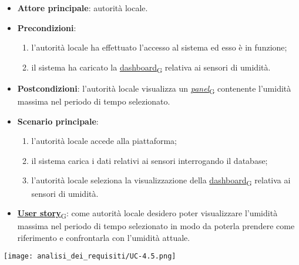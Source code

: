 \begin{itemize}
	\item \textbf{Attore principale}: autorità locale.
	\item \textbf{Precondizioni}:
	      \begin{enumerate}
		      \item l'autorità locale ha effettuato l'accesso al sistema ed esso è in funzione;
		      \item il sistema ha caricato la \href{https://7last.github.io/docs/rtb/documentazione-interna/glossario\#dashboard}{dashboard\textsubscript{G}} relativa ai sensori di umidità.
	      \end{enumerate}
	\item \textbf{Postcondizioni}: l'autorità locale visualizza un \href{https://7last.github.io/docs/rtb/documentazione-interna/glossario\#panel}{\textit{panel}\textsubscript{G}} contenente l'umidità massima nel periodo di tempo selezionato.
	\item \textbf{Scenario principale}:
	      \begin{enumerate}
		      \item l'autorità locale accede alla piattaforma;
		      \item il sistema carica i dati relativi ai sensori interrogando il database;
		      \item l'autorità locale seleziona la visualizzazione della \href{https://7last.github.io/docs/rtb/documentazione-interna/glossario\#dashboard}{dashboard\textsubscript{G}} relativa ai sensori di umidità.
	      \end{enumerate}
	\item \href{https://7last.github.io/docs/rtb/documentazione-interna/glossario\#user-story}{\textbf{User story}\textsubscript{G}}:
	      come autorità locale desidero poter visualizzare l'umidità massima nel periodo di tempo selezionato
	      in modo da poterla prendere come riferimento e confrontarla con l'umidità attuale.
\end{itemize}
\begin{center}
	\texttt{[image: analisi\_dei\_requisiti/UC-4.5.png]}
\end{center}

\newpage

